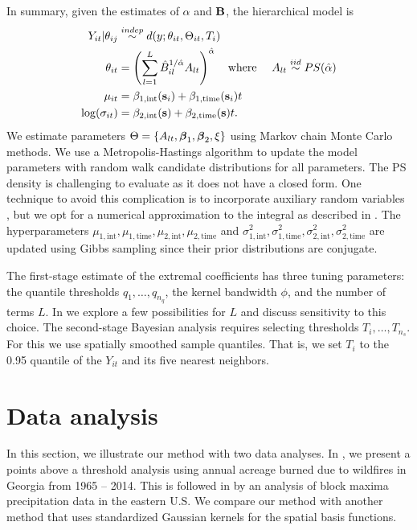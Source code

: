 \documentclass[11pt]{article}
\begin{document}
In summary, given the estimates of $\alpha$ and $\mbox{\bf B}$, the hierarchical model is
\begin{align} \label{ebeq:bayesmodel}
  Y_{it} |\theta_{ij} &\stackrel{indep}{\sim} d(y;\theta_{it},\Theta_{it}, T_i) \\
  \theta_{it} &= \left(\sum_{l=1}^L{\hat B}_{il}^{1/\hat{\alpha}}A_{lt}\right)^{\hat{\alpha}}
  \text{\ \ \ where \ \ \ }
  A_{lt} \stackrel{iid}{\sim} PS(\hat{\alpha})\nonumber\\
  \mu_{it} &= \beta_{1, \text{int}}(\mbox{\bf s}_i) + \beta_{1, \text{time}}(\mbox{\bf s}_i) t \nonumber \\
  \log(\sigma_{it}) &= \beta_{2, \text{int}}(\mbox{\bf s}) + \beta_{2, \text{time}}(\mbox{\bf s}) t. \nonumber
\end{align}
We estimate parameters $\Theta = \left\{A_{lt}, \mbox{\boldmath $\beta$}_1, \mbox{\boldmath $\beta$}_2, \xi \right\}$ using Markov chain Monte Carlo methods.
We use a Metropolis-Hastings algorithm to update the model parameters with random walk candidate distributions for all parameters.
The PS density is challenging to evaluate as it does not have a closed form.
One technique to avoid this complication is to incorporate auxiliary random variables \citep{Stephenson2009}, but we opt for a numerical approximation to the integral as described in .
The hyperparameters $\mu_{1, \text{int}}, \mu_{1, \text{time}}, \mu_{2, \text{int}}, \mu_{2, \text{time}}$ and $\sigma^2_{1, \text{int}}, \sigma^2_{1, \text{time}}, \sigma^2_{2, \text{int}}, \sigma^2_{2, \text{time}}$ are updated using Gibbs sampling since their prior distributions are conjugate.

The first-stage estimate of the extremal coefficients has three tuning parameters: the quantile thresholds $q_1,\ldots,q_{n_q}$, the kernel bandwidth $\phi$, and the number of terms $L$.
In  we explore a few possibilities for $L$ and discuss sensitivity to this choice.
The second-stage Bayesian analysis requires selecting thresholds $T_i,\ldots,T_{n_s}$.  For this we use spatially smoothed sample quantiles.
That is, we set $T_i$ to the 0.95 quantile of the $Y_{it}$ and its five nearest neighbors.

\section{Data analysis}\label{ebs:analysis}
In this section, we illustrate our method with two data analyses.
In , we present a points above a threshold analysis using annual acreage burned due to wildfires in Georgia from 1965 -- 2014.
This is followed in  by an analysis of block maxima precipitation data in the eastern U.S.
We compare our method with another method that uses standardized Gaussian kernels for the spatial basis functions.
\end{document}
